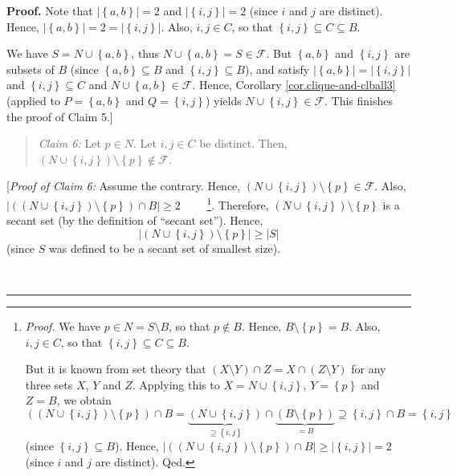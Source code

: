\documentclass[numbers=enddot,12pt,final,onecolumn,notitlepage]{scrartcl}%
\theoremstyle{definition}
\newenvironment{statement}{\begin{quote}}{\end{quote}}
\newenvironment{proof}[1][Proof]{\noindent\textbf{#1.} }{\ \rule{0.5em}{0.5em}}
\renewcommand{\geq}{\geqslant}
\theoremstyle{plainsl}
\begin{document}
\begin{proof}
Note that $\left\vert \left\{  a,b\right\}  \right\vert =2$ and $\left\vert
\left\{  i,j\right\}  \right\vert =2$ (since $i$ and $j$ are distinct). Hence,
$\left\vert \left\{  a,b\right\}  \right\vert =2=\left\vert \left\{
i,j\right\}  \right\vert $. Also, $i,j\in C$, so that $\left\{  i,j\right\}
\subseteq C\subseteq B$.

We have $S=N\cup\left\{  a,b\right\}  $, thus $N\cup\left\{  a,b\right\}
=S\in\mathcal{F}$. But $\left\{  a,b\right\}  $ and $\left\{  i,j\right\}  $
are subsets of $B$ (since $\left\{  a,b\right\}  \subseteq B$ and $\left\{
i,j\right\}  \subseteq B$), and satisfy $\left\vert \left\{  a,b\right\}
\right\vert =\left\vert \left\{  i,j\right\}  \right\vert $ and $\left\{
i,j\right\}  \subseteq C$ and $N\cup\left\{  a,b\right\}  \in\mathcal{F}$.
Hence, Corollary \ref{cor.clique-and-clball3} (applied to $P=\left\{
a,b\right\}  $ and $Q=\left\{  i,j\right\}  $) yields $N\cup\left\{
i,j\right\}  \in\mathcal{F}$. This finishes the proof of Claim 5.] \medskip

\begin{statement}
\textit{Claim 6:} Let $p\in N$. Let $i,j\in C$ be distinct. Then, $\left(
N\cup\left\{  i,j\right\}  \right)  \setminus\left\{  p\right\}
\notin\mathcal{F}$.
\end{statement}

[\textit{Proof of Claim 6:} Assume the contrary. Hence, $\left(  N\cup\left\{
i,j\right\}  \right)  \setminus\left\{  p\right\}  \in\mathcal{F}$. Also,
$\left\vert \left(  \left(  N\cup\left\{  i,j\right\}  \right)  \setminus
\left\{  p\right\}  \right)  \cap B\right\vert \geq2$%
\ \ \ \ \footnote{\textit{Proof.} We have $p\in N=S\setminus B$, so that
$p\notin B$. Hence, $B\setminus\left\{  p\right\}  =B$. Also, $i,j\in C$, so
that $\left\{  i,j\right\}  \subseteq C\subseteq B$.
\par
But it is known from set theory that $\left(  X\setminus Y\right)  \cap
Z=X\cap\left(  Z\setminus Y\right)  $ for any three sets $X$, $Y$ and $Z$.
Applying this to $X=N\cup\left\{  i,j\right\}  $, $Y=\left\{  p\right\}  $ and
$Z=B$, we obtain
\[
\left(  \left(  N\cup\left\{  i,j\right\}  \right)  \setminus\left\{
p\right\}  \right)  \cap B=\underbrace{\left(  N\cup\left\{  i,j\right\}
\right)  }_{\supseteq\left\{  i,j\right\}  }\cap\underbrace{\left(
B\setminus\left\{  p\right\}  \right)  }_{=B}\supseteq\left\{  i,j\right\}
\cap B=\left\{  i,j\right\}
\]
(since $\left\{  i,j\right\}  \subseteq B$). Hence, $\left\vert \left(
\left(  N\cup\left\{  i,j\right\}  \right)  \setminus\left\{  p\right\}
\right)  \cap B\right\vert \geq\left\vert \left\{  i,j\right\}  \right\vert
=2$ (since $i$ and $j$ are distinct). Qed.}. Therefore, $\left(  N\cup\left\{
i,j\right\}  \right)  \setminus\left\{  p\right\}  $ is a secant set (by the
definition of \textquotedblleft secant set\textquotedblright). Hence,
\begin{equation}
\left\vert \left(  N\cup\left\{  i,j\right\}  \right)  \setminus\left\{
p\right\}  \right\vert \geq\left\vert S\right\vert
\label{pf.thm.converse-strong.c6.pf.1}%
\end{equation}
(since $S$ was defined to be a secant set of smallest size).


\end{proof}
\end{document}

